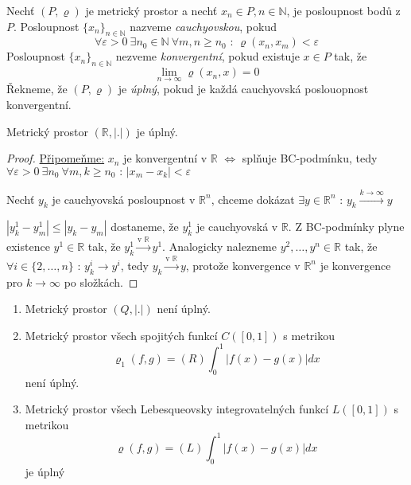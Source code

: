 \begin{definice}
Nechť $(P, \varrho)$ je metrický prostor a nechť $x_n \in P, n \in \mathbb{N}$, je posloupnost bodů z $P$. Posloupnost $\{ x_n \}_{n \in \mathbb{N}}$ nazveme \emph{cauchyovskou}, pokud
$$\forall \varepsilon > 0 \ \exists n_0 \in \mathbb{N} \ \forall m,n \geq n_0 \textrm{ : } \varrho(x_n, x_m) < \varepsilon$$
Posloupnost $\{ x_n \}_{n \in \mathbb{N}}$ nezveme \emph{konvergentní}, pokud existuje $x \in P$ tak, že
$$\lim_{n \rightarrow \infty} \varrho (x_n, x) = 0$$
Řekneme, že $(P, \varrho)$ je \emph{úplný}, pokud je každá cauchyovská poslouopnost konvergentní.
\end{definice}

\begin{vetal}
Metrický prostor $(\mathbb{R}, |.|)$ je úplný.
\end{vetal}

\begin{proof}
\underline{Připomeňme:} $x_n$ je konvergentní v $\mathbb{R}$ $\Leftrightarrow$ splňuje BC-podmínku, tedy $\forall \varepsilon > 0 \ \exists n_0 \ \forall m,k \geq n_0 \textrm{ : } |x_m - x_k| < \varepsilon$

Nechť $y_k$ je cauchyovská posloupnost v $\mathbb{R}^n$, chceme dokázat $\exists y \in \mathbb{R}^n \textrm{ : } y_k \overset{k \to \infty}{\to} y$ 

$|y_k^1 - y_m^1| \leq |y_k - y_m|$ dostaneme, že $y_k^1$ je cauchyovská v $\mathbb{R}$. Z BC-podmínky plyne existence $y^1 \in \mathbb{R}$ tak, že $y_k^1 \overset{\textrm{v }\mathbb{R}}{\to} y^1$. Analogicky nalezneme $y^2, \ldots, y^n \in \mathbb{R}$ tak, že $\forall i \in \{ 2, \ldots, n \} \textrm{ : } y_k^i \to y^i$, tedy $y_k \overset{\textrm{v } \mathbb{R}}{\to} y$, protože konvergence v $\mathbb{R}^n$ je konvergence pro $k \to \infty$ po složkách.
\end{proof}


\begin{priklad}
\begin{enumerate}
\item Metrický prostor $(Q, |.|)$ není úplný.
\item Metrický prostor všech spojitých funkcí $C([0, 1])$ s metrikou
$$\varrho_1(f,g) = (R) \int_0^1 |f(x) - g(x)| dx$$
není úplný.
\item Metrický prostor všech Lebesqueovsky integrovatelných funkcí $L([0,1])$ s metrikou
$$\varrho(f,g) = (L) \int_0^1 |f(x)-g(x)|dx$$
je úplný
\end{enumerate}
\end{priklad}

